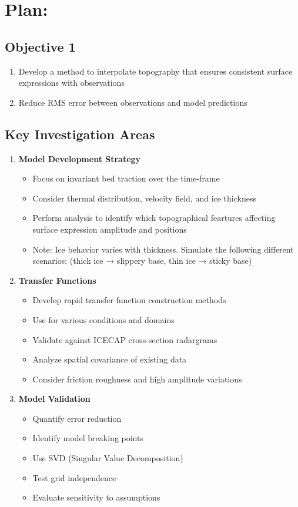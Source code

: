 \section*{Plan:}
\subsection*{Objective 1}
\begin{enumerate}
\item Develop a method to interpolate topography that ensures consistent surface expressions with observations
\item Reduce RMS error between observations and model predictions
\end{enumerate}

\subsection*{Key Investigation Areas}
\begin{enumerate}
\item\textbf{Model Development Strategy}
    \begin{itemize}
    \item Focus on invariant bed traction over the time-frame
    \item Consider thermal distribution, velocity field, and ice thickness
    \item Perform analysis to identify which topographical feartures affecting surface expression amplitude and positions
    \item Note: Ice behavior varies with thickness. Simulate the following different scenarios: (thick ice → slippery base, thin ice → sticky base)
    \end{itemize}
\item\textbf{Transfer Functions}
    \begin{itemize}
    \item Develop rapid transfer function construction methods
    \item Use for various conditions and domains
    \item Validate against ICECAP cross-section radargrams
    \item Analyze spatial covariance of existing data
    \item Consider friction roughness and high amplitude variations
    \end{itemize}
\item\textbf{Model Validation}
    \begin{itemize}
    \item Quantify error reduction
    \item Identify model breaking points
    \item Use SVD (Singular Value Decomposition)
    \item Test grid independence
    \item Evaluate sensitivity to assumptions
    \end{itemize}
\end{enumerate}


